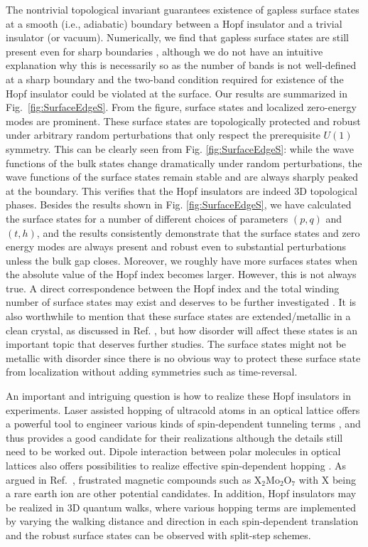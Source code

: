 \documentclass[twocolumn,prb,aps,epsfig,superscriptaddress,showpacs]{revtex4-1}
\begin{document}
The nontrivial topological invariant guarantees existence of gapless surface
states at a smooth (i.e., adiabatic) boundary between a Hopf insulator and a
trivial insulator (or vacuum). Numerically, we find that gapless surface states are
still present even for sharp boundaries \cite{supplement1},
although we do not have an intuitive explanation why this is necessarily so as
the number of bands is not well-defined at a sharp boundary and the two-band condition
required for existence of the Hopf insulator could be violated at the surface.
Our results are summarized in Fig.\ \ref{fig:SurfaceEdgeS}.
From the figure, surface states and localized zero-energy modes are
prominent. These surface states are topologically protected and robust under
arbitrary random perturbations that only respect the prerequisite $U(1)$
symmetry. This can be clearly seen from Fig. \ref{fig:SurfaceEdgeS}: while
the wave functions of the bulk states change dramatically under random
perturbations, the wave functions of the surface states remain stable and
are always sharply peaked at the boundary. This verifies that the Hopf
insulators are indeed $3$D topological phases. Besides the results shown in
Fig. \ref{fig:SurfaceEdgeS}, we have calculated the surface states for a
number of different choices of parameters $(p,q)$ and $(t,h)$, and the
results consistently demonstrate that the surface states and zero energy
modes are always present and robust even to substantial perturbations unless
the bulk gap closes. Moreover, we roughly have more surfaces states when the
absolute value of the Hopf index becomes larger. However, this is not always
true. A direct correspondence between the Hopf index and the total winding
number of surface states may exist and deserves to be further investigated
\cite{2012Neupert}. It is also worthwhile to mention that these surface
states are extended/metallic in a clean crystal, as discussed in Ref. \cite%
{2008Moore}, but how disorder will affect these states is an important topic
that deserves further studies. The surface states might not be metallic with
disorder since there is no obvious way to protect these surface state from
localization without adding symmetries such as time-reversal.

An important and intriguing question is how to realize these Hopf insulators
in experiments. Laser assisted hopping of ultracold atoms in an optical
lattice offers a powerful tool to engineer various kinds of spin-dependent
tunneling terms \cite{AtomsInOL}, and thus provides a good candidate for
their realizations although the details still need to be worked out. Dipole
interaction between polar molecules in optical lattices also offers
possibilities to realize effective spin-dependent hopping \cite{2006Micheli}%
. As argued in Ref.\ \cite{2008Moore}, frustrated magnetic compounds such as
$\text{X}_{2}\text{Mo}_{2}\text{O}_{7}$ with $\text{X}$ being a rare earth
ion are other potential candidates. In addition, Hopf insulators may be
realized in 3D quantum walks\cite{2009Karski,2012Kitagawa}, where various
hopping terms are implemented by varying the walking distance and direction
in each spin-dependent translation and the robust surface states can be
observed with split-step schemes\cite{2012Kitagawa}.
\end{document}
